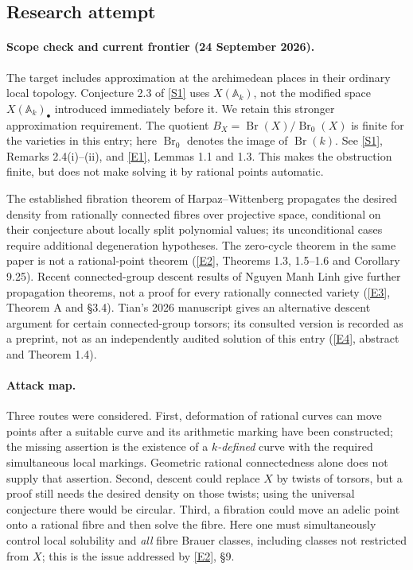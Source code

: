 \documentclass[11pt]{article}
\newcommand{\A}{\mathbb{A}}
\newcommand{\sref}[2]{\hyperlink{source:#1:#2}{[S#2]}}
\newcommand{\eref}[2]{\hyperlink{extra:#1:#2}{[E#2]}}
\begin{document}
\subsection{Research attempt}

\paragraph{Scope check and current frontier (24 September 2026).}
The target includes approximation at the archimedean places in their ordinary
local topology.  Conjecture 2.3 of \sref{151}{1} uses $X(\A_k)$, not the modified
space $X(\A_k)_\bullet$ introduced immediately before it.  We retain this stronger
approximation requirement.  The quotient
$B_X=\operatorname{Br}(X)/\operatorname{Br}_0(X)$ is finite for the varieties in
this entry; here $\operatorname{Br}_0$ denotes the image of
$\operatorname{Br}(k)$.  See \sref{151}{1}, Remarks 2.4(i)--(ii), and
\eref{151}{1}, Lemmas 1.1 and 1.3.
This makes the obstruction finite, but does not make solving it by rational
points automatic.

The established fibration theorem of Harpaz--Wittenberg propagates the desired
density from rationally connected fibres over projective space, conditional on
their conjecture about locally split polynomial values; its unconditional cases
require additional degeneration hypotheses.  The zero-cycle theorem in the
same paper is not a rational-point theorem
(\eref{151}{2}, Theorems 1.3, 1.5--1.6 and Corollary 9.25).
Recent connected-group descent results of Nguyen Manh Linh give further
propagation theorems, not a proof for every rationally connected variety
(\eref{151}{3}, Theorem A and \S3.4).
Tian's 2026 manuscript gives an alternative descent argument for certain
connected-group torsors; its consulted version is recorded as a preprint, not
as an independently audited solution of this entry (\eref{151}{4}, abstract
and Theorem 1.4).

\paragraph{Attack map.}
Three routes were considered.  First, deformation of rational curves can move
points after a suitable curve and its arithmetic marking have been constructed;
the missing assertion is the existence of a \emph{$k$-defined} curve with the
required simultaneous local markings.  Geometric rational connectedness alone
does not supply that assertion.  Second, descent could replace $X$ by twists
of torsors, but a proof still needs the desired density on those twists; using
the universal conjecture there would be circular.  Third, a fibration could
move an adelic point onto a rational fibre and then solve the fibre.  Here one
must simultaneously control local solubility and \emph{all} fibre Brauer
classes, including classes not restricted from $X$; this is the issue addressed
by \eref{151}{2}, \S9.
\end{document}
